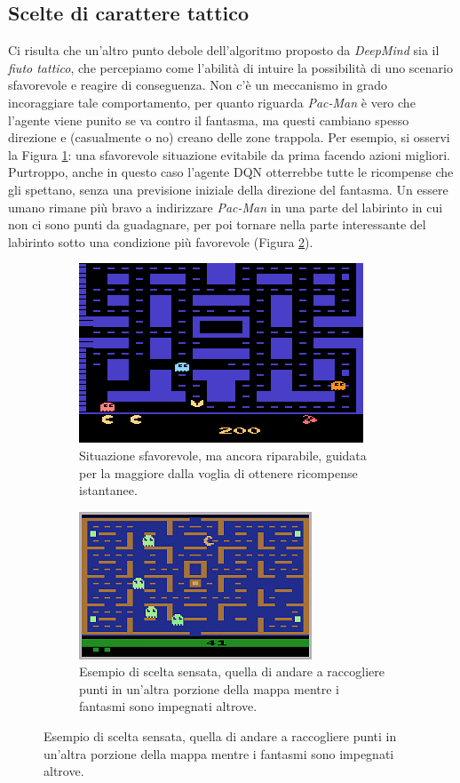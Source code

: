 \documentclass[twoside,twocolumn,10pt]{extarticle}
\theoremstyle{definition}
\begin{document}
	\subsection{Scelte di carattere tattico}
		Ci risulta che un'altro punto debole dell'algoritmo proposto da \textit{DeepMind} sia il \textit{fiuto tattico}, che percepiamo come l'abilità di intuire la possibilità di uno scenario sfavorevole e reagire di conseguenza. Non c'è un meccanismo in grado incoraggiare tale comportamento, per quanto riguarda \textit{Pac-Man} è vero che l'agente viene punito se va contro il fantasma, ma questi cambiano spesso direzione e (casualmente o no) creano delle zone trappola. Per esempio, si osservi la Figura \ref{fig:subpacman}: una sfavorevole situazione evitabile da prima facendo azioni migliori. Purtroppo, anche in questo caso l'agente DQN otterrebbe tutte le ricompense che gli spettano, senza una previsione iniziale della direzione del fantasma. Un essere umano rimane più bravo a indirizzare \textit{Pac-Man} in una parte del labirinto in cui non ci sono punti da guadagnare, per poi tornare nella parte interessante del labirinto sotto una condizione più favorevole (Figura \ref{fig:subpacman1}).
		
		\begin{figure}[ht!]
			\centering
			
			\begin{subfigure}[b]{.49\textwidth}
				\includegraphics[scale=1.05]{images/pacman.png}
				\caption{Situazione sfavorevole, ma ancora riparabile, guidata per la maggiore dalla voglia di ottenere ricompense istantanee.}
				\label{fig:subpacman}
			\end{subfigure}

			\begin{subfigure}[b]{.49\textwidth}
				\includegraphics[scale=1.3]{images/pacman1.png}
				\caption{Esempio di scelta sensata, quella di andare a raccogliere punti in un'altra porzione della mappa mentre i fantasmi sono impegnati altrove.}
				\label{fig:subpacman1}
			\end{subfigure}
			
			\label{fig:pacman}
		\end{figure}
	
\end{document}
